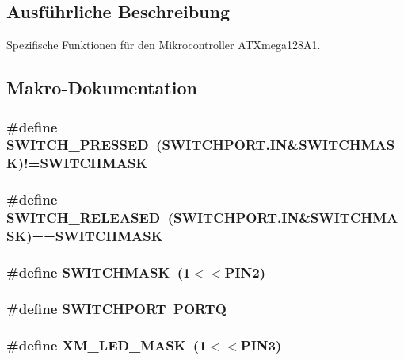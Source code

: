\subsection{Ausführliche Beschreibung}
Spezifische Funktionen für den Mikrocontroller ATXmega128A1. 

\subsection{Makro-\/Dokumentation}
\subsubsection[{SWITCH\_\-PRESSED}]{\setlength{\rightskip}{0pt plus 5cm}\#define SWITCH\_\-PRESSED~(SWITCHPORT.IN\&SWITCHMASK)!=SWITCHMASK}\label{xmega_8h_aee0a92534030b96677d5c5f9740dd5d8}
\subsubsection[{SWITCH\_\-RELEASED}]{\setlength{\rightskip}{0pt plus 5cm}\#define SWITCH\_\-RELEASED~(SWITCHPORT.IN\&SWITCHMASK)==SWITCHMASK}\label{xmega_8h_a504feaf326beca68d69242b30efb5da6}
\subsubsection[{SWITCHMASK}]{\setlength{\rightskip}{0pt plus 5cm}\#define SWITCHMASK~(1$<$$<$PIN2)}\label{xmega_8h_ab26d18f5aaff71dabdeb84cb0bf7b043}
\subsubsection[{SWITCHPORT}]{\setlength{\rightskip}{0pt plus 5cm}\#define SWITCHPORT~PORTQ}\label{xmega_8h_aad3acfe151d9c0f1186ea6978f5e48d5}
\subsubsection[{XM\_\-LED\_\-MASK}]{\setlength{\rightskip}{0pt plus 5cm}\#define XM\_\-LED\_\-MASK~(1$<$$<$PIN3)}\label{xmega_8h_a1c1ad2e1dbf9a092d012b2feaa0963bc}
